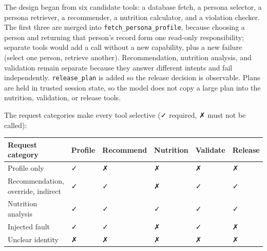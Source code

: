 \documentclass[
  10pt,
  letterpaper,
]{article}
\begin{document}
The design began from six candidate tools: a database fetch, a persona
selector, a persona retriever, a recommender, a nutrition calculator,
and a violation checker. The first three are merged into
\texttt{fetch\_persona\_profile}, because choosing a person and
returning that person's record form one read-only responsibility;
separate tools would add a call without a new capability, plus a new
failure (select one person, retrieve another). Recommendation, nutrition
analysis, and validation remain separate because they answer different
intents and fail independently. \texttt{release\_plan} is added so the
release decision is observable. Plans are held in trusted session state,
so the model does not copy a large plan into the nutrition, validation,
or release tools.

The request categories make every tool selective (✓ required, ✗ must not
be called):

\begin{longtable}[]{@{}
  >{\raggedright\arraybackslash}p{}
  >{\centering\arraybackslash}p{}
  >{\centering\arraybackslash}p{}
  >{\centering\arraybackslash}p{}
  >{\centering\arraybackslash}p{}
  >{\centering\arraybackslash}p{}@{}}
\toprule\noalign{}
\begin{minipage}[b]{\linewidth}\raggedright
Request category
\end{minipage} & \begin{minipage}[b]{\linewidth}\centering
Profile
\end{minipage} & \begin{minipage}[b]{\linewidth}\centering
Recommend
\end{minipage} & \begin{minipage}[b]{\linewidth}\centering
Nutrition
\end{minipage} & \begin{minipage}[b]{\linewidth}\centering
Validate
\end{minipage} & \begin{minipage}[b]{\linewidth}\centering
Release
\end{minipage} \\
\midrule\noalign{}
\endhead
\bottomrule\noalign{}
\endlastfoot
Profile only & ✓ & ✗ & ✗ & ✗ & ✗ \\
Recommendation, override, indirect & ✓ & ✓ & ✗ & ✓ & ✓ \\
Nutrition analysis & ✓ & ✓ & ✓ & ✓ & ✓ \\
Injected fault & ✓ & ✓ & ✗ & ✓ & ✗ \\
Unclear identity & ✗ & ✗ & ✗ & ✗ & ✗ \\
\end{longtable}
\end{document}
